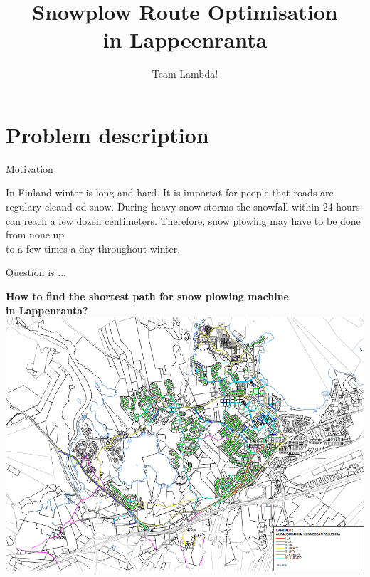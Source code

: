 \documentclass[hyperref={pdfpagelabels=false}, xcolor=x11names,compress]{beamer}
\newcommand{\<}[1]{\begin{column}{#1}}
\renewcommand{\>}{\end{column}}
\begin{document}
\begin{frame}
\title{Snowplow Route Optimisation \\in Lappeenranta}
\author{Team Lambda!}
\date{}
\titlepage
\end{frame}


\section{Problem description}
\begin{frame}{Motivation}
\begin{center}


 In Finland winter is long and hard. It is importat for people that roads are regulary cleand od snow. During heavy snow storms the snowfall within 24 hours can reach a few dozen centimeters. Therefore, snow plowing may have to be done from none up \\ 
 to a few times a day throughout winter.
 \end{center}
\end{frame}

\begin{frame}{Question is ... }
\begin{center}\textbf{
How to find the shortest path for snow plowing machine \\ 
in Lappenranta?} \\


\includegraphics[scale=.25]{map.png}
\end{center}

\end{frame}
\end{document}
